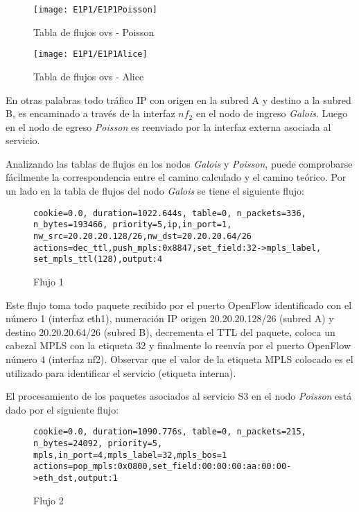 \begin{figure}[h!] 
\centering    
\texttt{[image: E1P1/E1P1Poisson]}
\caption[Tabla de flujos ovs - Poisson]{Tabla de flujos ovs - Poisson}
\label{fig:CU1P1DumpFlows3}
\end{figure}

\begin{figure}[h!] 
\centering    
\texttt{[image: E1P1/E1P1Alice]}
\caption[Tabla de flujos ovs - Alice]{Tabla de flujos ovs - Alice}
\label{fig:CU1P1DumpFlows4}
\end{figure}


\newpage
En otras palabras todo tr\'afico IP con origen en la subred A y destino a la subred B, es encaminado a través de la interfaz $nf_2$ en el nodo de ingreso \textit{Galois}. Luego en el nodo de egreso \textit{Poisson} es reenviado por la interfaz externa asociada al servicio.

Analizando las tablas de flujos en los nodos \textit{Galois} y \textit{Poisson}, puede comprobarse fácilmente la correspondencia entre el camino calculado y el camino te\'orico. Por un lado en la tabla de flujos del nodo \textit{Galois} se tiene el siguiente flujo:

\begin{figure}[h]
\texttt{cookie=0.0, duration=1022.644s, table=0, n\_packets=336, \\ 
n\_bytes=193466, priority=5,ip,in\_port=1, \\
nw\_src=20.20.20.128/26,nw\_dst=20.20.20.64/26 \\
actions=dec\_ttl,push\_mpls:0x8847,set\_field:32->mpls\_label, \\
set\_mpls\_ttl(128),output:4}
\centering
\caption{Flujo 1}
\label{fig:Flujo1}
\end{figure}

Este flujo toma todo paquete recibido por el puerto OpenFlow identificado con el n\'umero 1 (interfaz eth1), numeración IP origen 20.20.20.128/26 (subred A) y destino 20.20.20.64/26 (subred B), decrementa el TTL del paquete, coloca un cabezal MPLS con la etiqueta 32 y finalmente lo reenvía por el puerto OpenFlow n\'umero 4 (interfaz nf2). Observar que el valor de la etiqueta MPLS colocado es el utilizado para identificar el servicio (etiqueta interna). 

El procesamiento de los paquetes asociados al servicio S3 en el nodo \textit{Poisson} est\'a dado por el siguiente flujo:

\begin{figure}[h]
\texttt{cookie=0.0, duration=1090.776s, table=0, n\_packets=215, \\ 
n\_bytes=24092, priority=5, mpls,in\_port=4,mpls\_label=32,mpls\_bos=1 \\
actions=pop\_mpls:0x0800,set\_field:00:00:00:aa:00:00->eth\_dst,output:1 }
\centering
\caption{Flujo 2}
\label{fig:Flujo2}
\end{figure}

